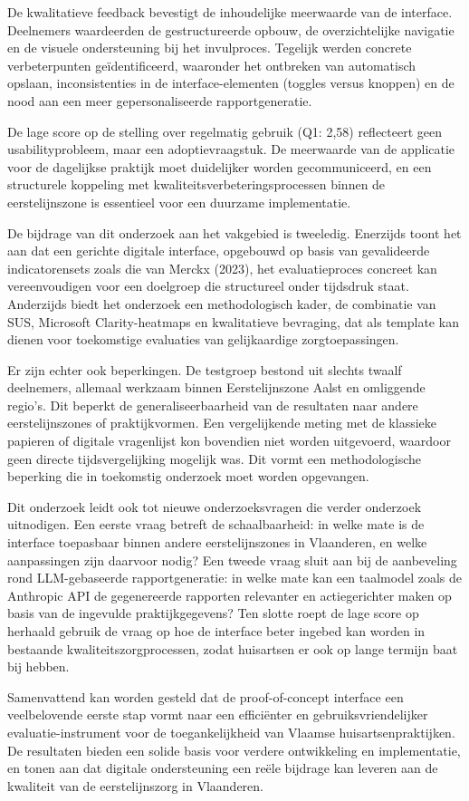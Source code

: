 De kwalitatieve feedback bevestigt de inhoudelijke meerwaarde van de interface. 
Deelnemers waardeerden de gestructureerde opbouw, de overzichtelijke navigatie en de visuele ondersteuning bij het invulproces. 
Tegelijk werden concrete verbeterpunten geïdentificeerd, waaronder het ontbreken van automatisch opslaan, inconsistenties in de interface-elementen (toggles versus knoppen) en de nood aan een meer gepersonaliseerde rapportgeneratie.
\medskip

De lage score op de stelling over regelmatig gebruik (Q1: 2,58) reflecteert geen usabilityprobleem, maar een adoptievraagstuk. 
De meerwaarde van de applicatie voor de dagelijkse praktijk moet duidelijker worden gecommuniceerd, en een structurele koppeling met kwaliteitsverbeteringsprocessen binnen de eerstelijnszone is essentieel voor een duurzame implementatie.
\medskip

De bijdrage van dit onderzoek aan het vakgebied is tweeledig. 
Enerzijds toont het aan dat een gerichte digitale interface, opgebouwd op basis van gevalideerde indicatorensets zoals die van Merckx (2023), het evaluatieproces concreet kan vereenvoudigen voor een doelgroep die structureel onder tijdsdruk staat. 
Anderzijds biedt het onderzoek een methodologisch kader, de combinatie van SUS, Microsoft Clarity-heatmaps en kwalitatieve bevraging, dat als template kan dienen voor toekomstige evaluaties van gelijkaardige zorgtoepassingen.
\medskip

Er zijn echter ook beperkingen. De testgroep bestond uit slechts twaalf deelnemers, allemaal werkzaam binnen Eerstelijnszone Aalst en omliggende regio's. 
Dit beperkt de generaliseerbaarheid van de resultaten naar andere eerstelijnszones of praktijkvormen. 
Een vergelijkende meting met de klassieke papieren of digitale vragenlijst kon bovendien niet worden uitgevoerd, waardoor geen directe tijdsvergelijking mogelijk was. 
Dit vormt een methodologische beperking die in toekomstig onderzoek moet worden opgevangen.
\medskip

Dit onderzoek leidt ook tot nieuwe onderzoeksvragen die verder onderzoek uitnodigen. 
Een eerste vraag betreft de schaalbaarheid: in welke mate is de interface toepasbaar binnen andere eerstelijnszones in Vlaanderen, en welke aanpassingen zijn daarvoor nodig? 
Een tweede vraag sluit aan bij de aanbeveling rond LLM-gebaseerde rapportgeneratie: in welke mate kan een taalmodel zoals de Anthropic API de gegenereerde rapporten relevanter en actiegerichter maken op basis van de ingevulde praktijkgegevens? 
Ten slotte roept de lage score op herhaald gebruik de vraag op hoe de interface beter ingebed kan worden in bestaande kwaliteitszorgprocessen, zodat huisartsen er ook op lange termijn baat bij hebben.
\medskip

Samenvattend kan worden gesteld dat de proof-of-concept interface een veelbelovende eerste stap vormt naar een efficiënter en gebruiksvriendelijker evaluatie-instrument voor de toegankelijkheid van Vlaamse huisartsenpraktijken. 
De resultaten bieden een solide basis voor verdere ontwikkeling en implementatie, en tonen aan dat digitale ondersteuning een reële bijdrage kan leveren aan de kwaliteit van de eerstelijnszorg in Vlaanderen.

